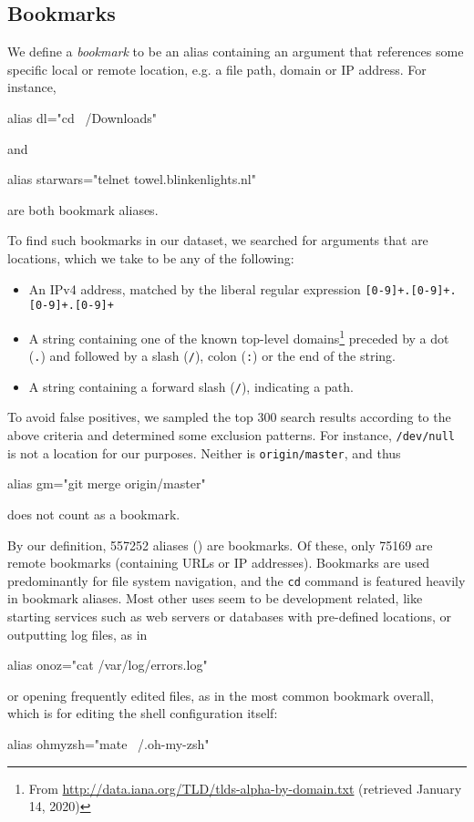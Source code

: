 \subsection{Bookmarks}

We define a \emph{bookmark} to be an alias containing an argument that references some specific local or remote location, e.g. a file path, domain or IP address.
For instance, 
\begin{CVerbatim}
alias dl="cd ~/Downloads"
\end{CVerbatim}
and
\begin{CVerbatim}
alias starwars="telnet towel.blinkenlights.nl"
\end{CVerbatim}
are both bookmark aliases.

To find such bookmarks in our dataset, we searched for arguments that are locations, which we take to be any of the following:
\begin{itemize}
    \item An IPv4 address, matched by the liberal regular expression \verb|[0-9]+.[0-9]+.[0-9]+.[0-9]+|
    \item A string containing one of the known top-level domains\footnote{From \url{http://data.iana.org/TLD/tlds-alpha-by-domain.txt} (retrieved January 14, 2020)} preceded by a dot (\verb|.|) and followed by a slash (\verb|/|), colon (\verb|:|) or the end of the string.
    \item A string containing a forward slash (\verb|/|), indicating a path.
\end{itemize}
To avoid false positives, we sampled the top 300 search results according to the above criteria and determined some exclusion patterns.
For instance, \texttt{/dev/null} is not a location for our purposes.
Neither is \texttt{origin/master}, and thus 
\begin{CVerbatim}
alias gm="git merge origin/master"
\end{CVerbatim}
does not count as a bookmark.

By our definition, \num{557252} aliases () are bookmarks.
Of these, only \num{75169} are remote bookmarks (containing URLs or IP addresses).
Bookmarks are used predominantly for file system navigation, and the \texttt{cd} command is featured heavily in bookmark aliases.
Most other uses seem to be development related, like starting services such as web servers or databases with pre-defined locations, or outputting log files, as in 
\begin{CVerbatim}
alias onoz="cat /var/log/errors.log"
\end{CVerbatim}
or opening frequently edited files, as in the most common bookmark overall, which is for editing the shell configuration itself:
\begin{CVerbatim}
alias ohmyzsh="mate ~/.oh-my-zsh"
\end{CVerbatim}
